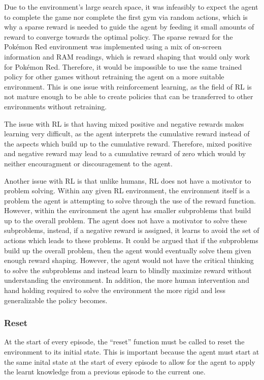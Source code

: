 Due to the environment's large search space, it was infeasibly to expect the agent to complete the game nor complete the first gym via random actions, which is why a sparse reward is needed to guide the agent by feeding it small amounts of reward to converge towards the optimal policy. The sparse reward for the Pokémon Red environment was implemented using a mix of on-screen information and RAM readings, which is reward shaping that would only work for Pokémon Red. Therefore, it would be impossible to use the same trained policy for other games without retraining the agent on a more suitable environment. This is one issue with reinforcement learning, as the field of RL is not mature enough to be able to create policies that can be transferred to other environments without retraining.

The issue with RL is that having mixed positive and negative rewards makes learning very difficult, as the agent interprets the cumulative reward instead of the aspects  which build up to the cumulative reward. Therefore, mixed positive and negative reward may lead to a cumulative reward of zero which would by neither encouragment or discouragement to the agent. 

Another issue with RL is that unlike humans, RL does not have a motivator to problem solving. Within any given RL environment, the environment itself is a problem the agent is attempting to solve through the use of the reward function. However, within the environment the agent has smaller subproblems that build up to the overall problem. The agent does not have a motivator to solve these subproblems, instead, if a negative reward is assigned, it learns to avoid the set of actions which leads to these problems. It could be argued that if the subproblems build up the overall problem, then the agent would eventually solve them given enough reward shaping. However, the agent would not have the critical thinking to solve the subproblems and instead learn to blindly maximize reward without understanding the environment. In addition, the more human intervention and hand holding required to solve the environment the more rigid and less generalizable the policy becomes.

\subsubsection*{Reset}

At the start of every episode, the ``reset'' function must be called to reset the environment to its initial state. This is important because the agent must start at the same inital state at the start of every episode to allow for the agent to apply the learnt knowledge from a previous episode to the current one. 

